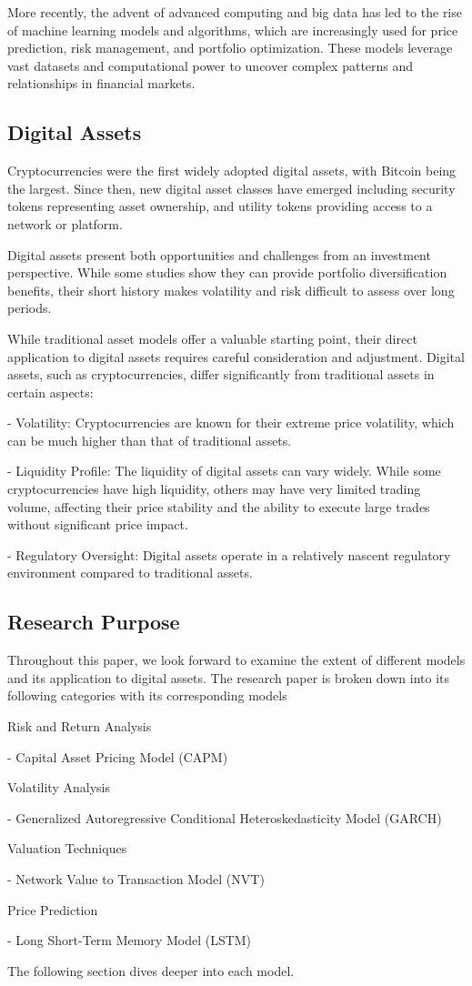 More recently, the advent of advanced computing and big data has led to the rise of machine learning models and algorithms, which are increasingly used for price prediction, risk management, and portfolio optimization. These models leverage vast datasets and computational power to uncover complex patterns and relationships in financial markets.

\subsection{Digital Assets}

Cryptocurrencies were the first widely adopted digital assets, with Bitcoin being the largest. Since then, new digital asset classes have emerged including security tokens representing asset ownership, and utility tokens providing access to a network or platform.

Digital assets present both opportunities and challenges from an investment perspective. While some studies show they can provide portfolio diversification benefits, their short history makes volatility and risk difficult to assess over long periods.

While traditional asset models offer a valuable starting point, their direct application to digital assets requires careful consideration and adjustment. Digital assets, such as cryptocurrencies, differ significantly from traditional assets in certain aspects:

- Volatility: Cryptocurrencies are known for their extreme price volatility, which can be much higher than that of traditional assets.

- Liquidity Profile: The liquidity of digital assets can vary widely. While some cryptocurrencies have high liquidity, others may have very limited trading volume, affecting their price stability and the ability to execute large trades without significant price impact.

- Regulatory Oversight: Digital assets operate in a relatively nascent regulatory environment compared to traditional assets.

\subsection{Research Purpose}

Throughout this paper, we look forward to examine the extent of different models and its application to digital assets. The research paper is broken down into its following categories with its corresponding models

Risk and Return Analysis

- Capital Asset Pricing Model (CAPM)

Volatility Analysis

- Generalized Autoregressive Conditional Heteroskedasticity Model (GARCH) 


Valuation Techniques

- Network Value to Transaction Model (NVT)

Price Prediction

- Long Short-Term Memory Model (LSTM)

The following section dives deeper into each model.